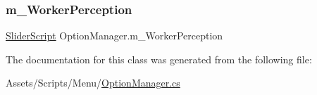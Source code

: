 \mbox{\label{class_option_manager_a081a54968d9c11233e97c1cc843f64df}} 
\subsubsection{\texorpdfstring{m\_WorkerPerception}{m\_WorkerPerception}}
{\footnotesize\ttfamily \mbox{\hyperlink{class_slider_script}{Slider\+Script}} Option\+Manager.\+m\+\_\+\+Worker\+Perception}



The documentation for this class was generated from the following file\+:\begin{DoxyCompactItemize}
\item 
Assets/\+Scripts/\+Menu/\mbox{\hyperlink{_option_manager_8cs}{Option\+Manager.\+cs}}\end{DoxyCompactItemize}
